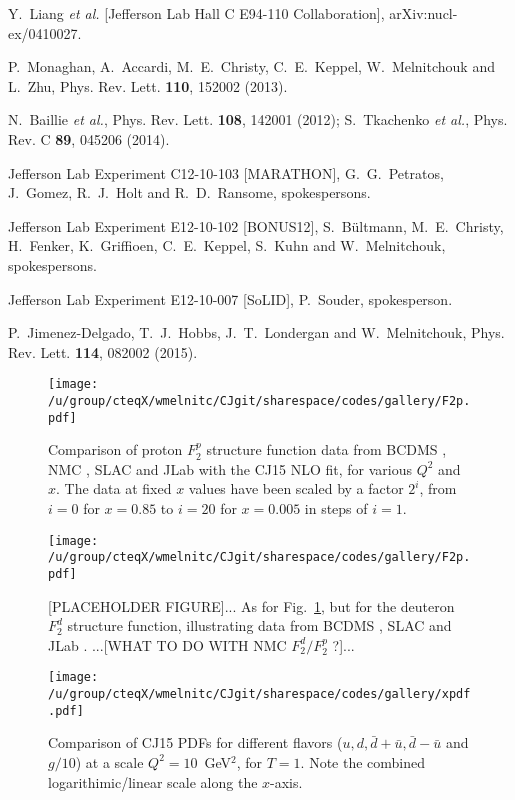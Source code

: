\documentclass[aps,prd,amsmath,preprint]{revtex4}
\begin{document}
\begin{thebibliography}{99}
Y.~Liang {\it et al.} [Jefferson Lab Hall C E94-110 Collaboration],
arXiv:nucl-ex/0410027.

P.~Monaghan, A.~Accardi, M.~E.~Christy, C.~E.~Keppel, W.~Melnitchouk
and L.~Zhu,
Phys. Rev. Lett. {\bf 110}, 152002 (2013).

N.~Baillie {\it et al.},
Phys. Rev. Lett. {\bf 108}, 142001 (2012);
%
S.~Tkachenko {\it et al.},
Phys. Rev. C {\bf 89}, 045206 (2014).

Jefferson Lab Experiment C12-10-103 [MARATHON],
G.~G.~Petratos, J.~Gomez, R.~J.~Holt and R.~D.~Ransome,
spokespersons.
 
Jefferson Lab Experiment E12-10-102 [BONUS12],
S.~B\"ultmann, M.~E.~Christy, H.~Fenker, K.~Griffioen, C.~E.~Keppel,
S.~Kuhn and W.~Melnitchouk,
spokespersons.
 
Jefferson Lab Experiment E12-10-007 [SoLID],
P.~Souder, spokesperson.

P.~Jimenez-Delgado, T.~J.~Hobbs, J.~T.~Londergan and W.~Melnitchouk,
Phys. Rev. Lett. {\bf 114}, 082002 (2015).

\end{thebibliography}


\begin{figure}[t]
\texttt{[image: /u/group/cteqX/wmelnitc/CJgit/sharespace/codes/gallery/F2p.pdf]}
\caption{Comparison of proton $F_2^p$ structure function data
	from BCDMS \cite{BCDMS}, NMC \cite{NMCp},
	SLAC \cite{SLAC} and JLab \cite{Malace}
	with the CJ15 NLO fit, for various $Q^2$ and $x$.
	The data at fixed $x$ values have been scaled by a factor
	$2^i$, from $i=0$ for $x=0.85$ to $i=20$ for $x=0.005$
	in steps of $i=1$.}
\label{fig:F2p}
\end{figure} 


\begin{figure}[t]
\texttt{[image: /u/group/cteqX/wmelnitc/CJgit/sharespace/codes/gallery/F2p.pdf]}
\caption{{\color{red}[PLACEHOLDER FIGURE]...}
	As for Fig.~\ref{fig:F2p}, but for the deuteron $F_2^d$
	structure function, illustrating data from BCDMS \cite{BCDMS},
	SLAC \cite{SLAC} and JLab \cite{Malace}.
	{\color{red}...[WHAT TO DO WITH NMC $F_2^d/F_2^p$ ?]...}}
\label{fig:F2d}
\end{figure} 


\begin{figure}[t]
\texttt{[image: /u/group/cteqX/wmelnitc/CJgit/sharespace/codes/gallery/xpdf.pdf]}
\caption{Comparison of CJ15 PDFs for different flavors
	($u, d, \bar d + \bar u, \bar d - \bar u$ and $g/10$)
	at a scale $Q^2=10$~GeV$^2$, for $T=1$.
	Note the combined logarithimic/linear scale along the $x$-axis.}
\label{fig:pdf}
\end{figure} 
\end{document}
